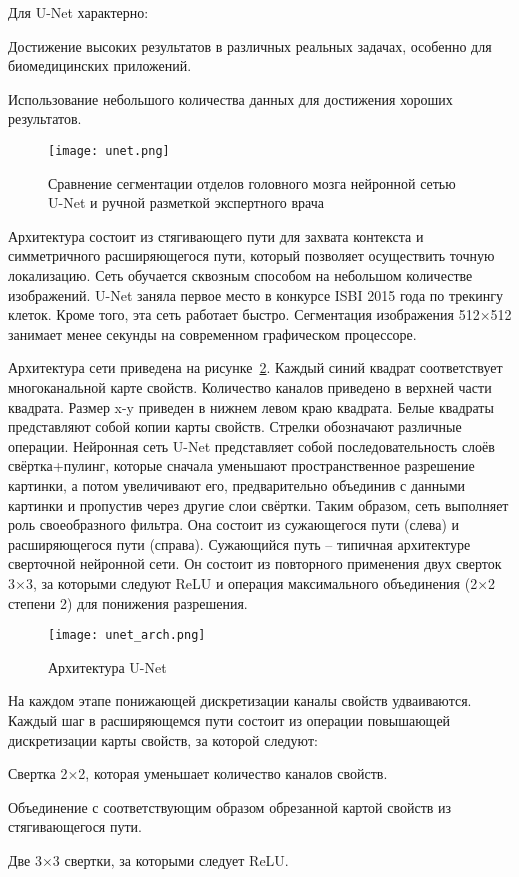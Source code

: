 Для U-Net характерно:
\begin{enumerate_num}
    \item Достижение высоких результатов в различных реальных задачах, особенно для биомедицинских приложений.
    \item Использование небольшого количества данных для достижения хороших результатов.
\end{enumerate_num}


\begin{figure}[ht]
    \centering
    \texttt{[image: unet.png]}
    \caption{Сравнение сегментации отделов головного мозга нейронной сетью U-Net и ручной разметкой экспертного врача}
    \label{func::unet}
\end{figure}

Архитектура состоит из стягивающего пути для захвата контекста и симметричного расширяющегося пути, который позволяет осуществить точную локализацию. 
Сеть обучается сквозным способом на небольшом количестве изображений. U-Net заняла первое место в конкурсе ISBI 2015 года по трекингу клеток. Кроме того, эта сеть работает быстро. Сегментация изображения 512×512 занимает менее секунды на современном графическом процессоре.

Архитектура сети приведена на рисунке~\ref{func::unet_arch}. Каждый синий квадрат соответствует многоканальной карте свойств. Количество каналов приведено в верхней части квадрата. Размер x-y приведен в нижнем левом краю квадрата. Белые квадраты представляют собой копии карты свойств. Стрелки обозначают различные операции. Нейронная сеть U-Net представляет собой последовательность слоёв свёртка+пулинг, которые сначала уменьшают пространственное разрешение картинки, а потом увеличивают его, предварительно объединив с данными картинки и пропустив через другие слои свёртки. Таким образом, сеть выполняет роль своеобразного фильтра. Она состоит из сужающегося пути (слева) и расширяющегося пути (справа). Сужающийся путь – типичная архитектуре сверточной нейронной сети. Он состоит из повторного применения двух сверток 3×3, за которыми следуют ReLU и операция максимального объединения (2×2 степени 2) для понижения разрешения.

\begin{figure}[ht]
    \centering
    \texttt{[image: unet\_arch.png]}
    \caption{Архитектура U-Net}
    \label{func::unet_arch}
\end{figure}

На каждом этапе понижающей дискретизации каналы свойств удваиваются. Каждый шаг в расширяющемся пути состоит из операции повышающей дискретизации карты свойств, за которой следуют:
\begin{enumerate_num}
    \item Свертка 2×2, которая уменьшает количество каналов свойств.
    \item Объединение с соответствующим образом обрезанной картой свойств из стягивающегося пути.
    \item Две 3×3 свертки, за которыми следует ReLU.
\end{enumerate_num}

